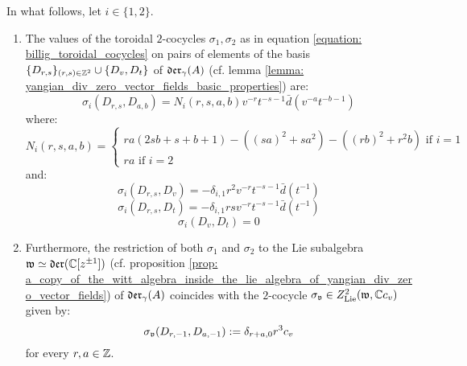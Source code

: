         \begin{lemma} \label{lemma: billig_toroidal_cocycles_on_yangian_div_zero_vector_fields}
            In what follows, let $i \in \{1, 2\}$.
            \begin{enumerate}
                \item The values of the toroidal $2$-cocycles $\sigma_1, \sigma_2$ as in equation \eqref{equation: billig_toroidal_cocycles} on pairs of elements of the basis $\{D_{r, s}\}_{(r, s) \in \mathbb{Z}^2} \cup \{D_v, D_t\}$ of $\mathfrak{der}_{\gamma}(A)$ (cf. lemma \ref{lemma: yangian_div_zero_vector_fields_basic_properties}) are:
                $$\sigma_i(D_{r, s}, D_{a, b}) = N_i(r, s, a, b) v^{-r} t^{-s - 1} \bar{d}( v^{-a} t^{-b - 1} )$$
                where:
                    \begin{equation} \label{equation: billig_cocycles_coefficient}
                        N_i(r, s, a, b) =
                        \begin{cases}
                            \text{$ra(2sb + s + b + 1) - ( (sa)^2 + s a^2 ) - ( (rb)^2 + r^2 b )$ if $i = 1$}
                            \\
                            \text{$ra$ if $i = 2$}
                        \end{cases}
                    \end{equation}
                and:
                    $$\sigma_i(D_{r, s}, D_v) = -\delta_{i, 1} r^2 v^{-r} t^{-s - 1} \bar{d}(t^{-1})$$
                    $$\sigma_i(D_{r, s}, D_t) = -\delta_{i, 1} rs v^{-r} t^{-s - 1} \bar{d}(t^{-1})$$
                    $$\sigma_i(D_v, D_t) = 0$$
                \item Furthermore, the restriction of both $\sigma_1$ and $\sigma_2$ to the Lie subalgebra $\mathfrak{w} \simeq \mathfrak{der}(\mathbb{C}[z^{\pm 1}])$ (cf. proposition \ref{prop: a_copy_of_the_witt_algebra_inside_the_lie_algebra_of_yangian_div_zero_vector_fields}) of $\mathfrak{der}_{\gamma}(A)$ coincides with the $2$-cocycle $\sigma_{\mathfrak{v}} \in Z^2_{\mathrm{Lie}}(\mathfrak{w}, \mathbb{C} c_v)$ given by:
                    $$\sigma_{\mathfrak{v}}(D_{r, -1}, D_{a, -1}) := \delta_{r + a, 0} r^3 c_v$$
                for every $r, a \in \mathbb{Z}$.
            \end{enumerate}
        \end{lemma}
